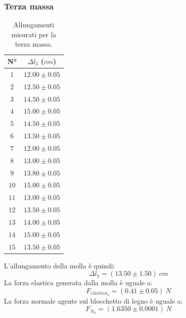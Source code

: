 \documentclass[11pt]{article}
\begin{document}
\subsubsection{Terza massa}
\begin{table}[H]
\centering
\begin{tabular}{|c|c|}
\hline
\textbf{N°} & \textbf{$\Delta l_3$ ($cm$)}\\
\hline
$1$ & $12.00\pm 0.05$ \\
\hline
$2$ & $12.50\pm 0.05$ \\
\hline
$3$ & $14.50\pm 0.05$ \\
\hline
$4$ & $15.00\pm 0.05$ \\
\hline
$5$ & $14.50\pm 0.05$ \\
\hline
$6$ & $13.50\pm 0.05$ \\
\hline
$7$ & $12.00\pm 0.05$ \\
\hline
$8$ & $13.00\pm 0.05$ \\
\hline
$9$ & $13.80\pm 0.05$ \\
\hline
$10$ & $15.00\pm 0.05$ \\
\hline
$11$ & $13.00\pm 0.05$ \\
\hline
$12$ & $13.50\pm 0.05$ \\
\hline
$13$ & $14.00\pm 0.05$ \\
\hline
$14$ & $15.00\pm 0.05$ \\
\hline
$15$ & $13.50\pm 0.05$ \\
\hline
\end{tabular}
\caption{Allungamenti misurati per la terza massa.}
\label{tab:}
\end{table}
L'allungamento della molla è quindi:
\begin{equation}
    \Delta l_3=(13.50\pm 1.50)\ cm
\end{equation}
La forza elastica generata dalla molla è uguale a:
\begin{equation}
    F_{elastica_3} = (0.41\pm 0.05)\ N
\end{equation}
La forza normale agente sul blocchetto di legno è uguale a:
\begin{equation}
    F_{N_3} = (1.6350\pm 0.0001)\ N
\end{equation}
\end{document}
